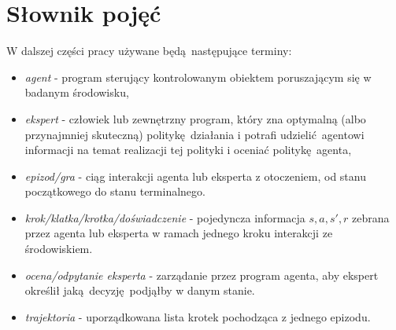 \section{Słownik pojęć}

W dalszej części pracy używane będą następujące terminy:

\begin{itemize}
\item \textit{agent} - program sterujący kontrolowanym obiektem poruszającym się w badanym środowisku,
\item \textit{ekspert} - człowiek lub zewnętrzny program, który zna optymalną (albo przynajmniej skuteczną) politykę działania i potrafi udzielić agentowi informacji na temat realizacji tej polityki i oceniać politykę agenta,
\item \textit{epizod/gra} - ciąg interakcji agenta lub eksperta z otoczeniem, od stanu początkowego do stanu terminalnego.
\item \textit{krok/klatka/krotka/doświadczenie} - pojedyncza informacja $s,a,s',r$ zebrana przez agenta lub eksperta w ramach jednego kroku interakcji ze środowiskiem.  
\item \textit{ocena/odpytanie eksperta} - zarządanie przez program agenta, aby ekspert określił jaką decyzję podjąłby w danym stanie.
\item \textit{trajektoria} - uporządkowana lista krotek pochodząca z jednego epizodu.
\end{itemize}
